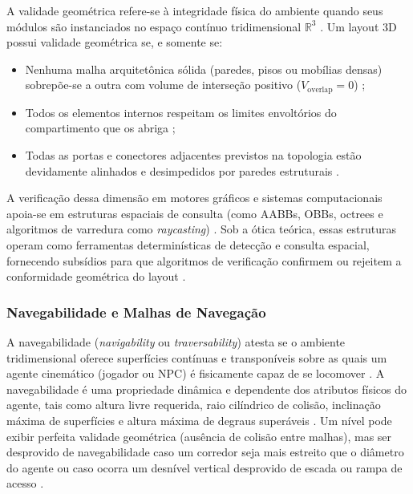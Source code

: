 A validade geométrica refere-se à integridade física do ambiente quando seus módulos são instanciados no espaço contínuo tridimensional $\mathbb{R}^3$ \cite{ericson2004realtime, sun2024roomplanner, xu2025constraint, feng2026repurposing3dgenerativemodel}. Um layout 3D possui validade geométrica se, e somente se:
\begin{itemize}
    \item Nenhuma malha arquitetônica sólida (paredes, pisos ou mobílias densas) sobrepõe-se a outra com volume de interseção positivo ($V_{\text{overlap}} = 0$) \cite{ericson2004realtime, xu2025constraint};
    \item Todos os elementos internos respeitam os limites envoltórios do compartimento que os abriga \cite{sun2024roomplanner, xu2025constraint};
    \item Todas as portas e conectores adjacentes previstos na topologia estão devidamente alinhados e desimpedidos por paredes estruturais \cite{linden2013designing, sun2024roomplanner, xu2025databasedrivenframework3dlevel}.
\end{itemize}

A verificação dessa dimensão em motores gráficos e sistemas computacionais apoia-se em estruturas espaciais de consulta (como AABBs, OBBs, octrees e algoritmos de varredura como \textit{raycasting}) \cite{shaker2016constructive, ericson2004realtime, sun2024roomplanner}. Sob a ótica teórica, essas estruturas operam como ferramentas determinísticas de detecção e consulta espacial, fornecendo subsídios para que algoritmos de verificação confirmem ou rejeitem a conformidade geométrica do layout \cite{shaker2016constructive, xu2025constraint}.

\subsubsection{Navegabilidade e Malhas de Navegação}
\label{sec:navegabilidade}

A navegabilidade (\textit{navigability} ou \textit{traversability}) atesta se o ambiente tridimensional oferece superfícies contínuas e transponíveis sobre as quais um agente cinemático (jogador ou NPC) é fisicamente capaz de se locomover \cite{snook2000simplified, sun2024roomplanner, xu2025constraint, xu2025databasedrivenframework3dlevel}. A navegabilidade é uma propriedade dinâmica e dependente dos atributos físicos do agente, tais como altura livre requerida, raio cilíndrico de colisão, inclinação máxima de superfícies e altura máxima de degraus superáveis \cite{snook2000simplified, xu2025constraint}. Um nível pode exibir perfeita validade geométrica (ausência de colisão entre malhas), mas ser desprovido de navegabilidade caso um corredor seja mais estreito que o diâmetro do agente ou caso ocorra um desnível vertical desprovido de escada ou rampa de acesso \cite{sun2024roomplanner, xu2025databasedrivenframework3dlevel}.


